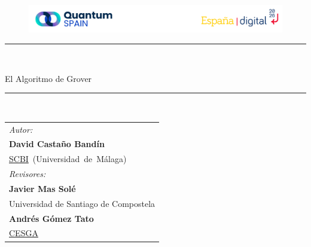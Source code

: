 \documentclass[a4paper,11pt]{article} %
\numberwithin{equation}{section}
\begin{document}
\renewcommand{\tablename}{Tabla}

\begin{center}

	\begin{figure}[t]
	\centering 
	\includegraphics[width=1\linewidth]{Figuras/Fig-Logo_QS_EspanaDigital.png}
	\end{figure}

\vspace{3cm}
\rule{65mm}{0.2mm}\\
\vspace{1cm}

{\sc\LARGE El Algoritmo de Grover}


\vspace{0.5cm}
\rule{65mm}{0.2mm}\\
\vspace{2cm}
\end{center}


\begin{tabular}{l}
{\sl\large Autor: } \\
{\bf\Large David Castaño Bandín} \\
\vspace{1em}\mbox{\hyperlink{https://www.scbi.uma.es/site/}{SCBI} (Universidad de Málaga)} \\
%
%
{\sl\large Revisores:} \\
{\bf\large Javier Mas Solé} \\
Universidad de Santiago de Compostela \\
{\bf\large Andrés Gómez Tato} \\
\hyperlink{http://www.cesga.es}{CESGA}
\vspace{1em}\mbox{} \\
\end{tabular}
\end{document}
